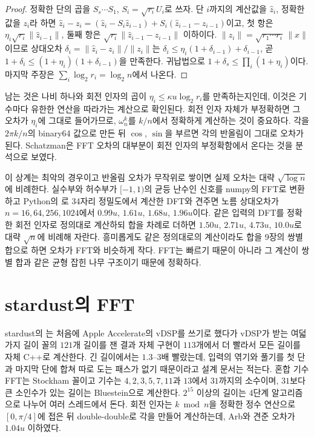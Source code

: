 \begin{proof}
정확한 단의 곱을 $S_s\cdots S_1$, $S_i=\sqrt{r_i}U_i$로 쓰자. 단 $i$까지의 계산값을 $\hat z_i$, 정확한 값을 $z_i$라 하면 $\hat z_i-z_i=(\hat z_i-S_i\hat z_{i-1})+S_i(\hat z_{i-1}-z_{i-1})$이고, 첫 항은 $\eta_i\sqrt{r_i}\|\hat z_{i-1}\|$, 둘째 항은 $\sqrt{r_i}\|\hat z_{i-1}-z_{i-1}\|$ 이하이다. $\|z_i\|=\sqrt{r_1\cdots r_i}\,\|x\|$이므로 상대오차 $\delta_i=\|\hat z_i-z_i\|/\|z_i\|$는 $\delta_i\le\eta_i(1+\delta_{i-1})+\delta_{i-1}$, 곧 $1+\delta_i\le(1+\eta_i)(1+\delta_{i-1})$을 만족한다. 귀납법으로 $1+\delta_s\le\prod_i(1+\eta_i)$이다. 마지막 주장은 $\sum_i\log_2r_i=\log_2n$에서 나온다.
\end{proof}

남는 것은 나비 하나와 회전 인자의 곱이 $\eta_i\le\kappa u\log_2r_i$를 만족하는지인데, 이것은 기수마다 유한한 연산을 따라가는 계산으로 확인된다. 회전 인자 자체가 부정확하면 그 오차가 $\eta_i$에 그대로 들어가므로, $\omega_n^k$를 $k/n$에서 정확하게 계산하는 것이 중요하다. 각을 $2\pi k/n$의 binary64 값으로 만든 뒤 $\cos$, $\sin$을 부르면 각의 반올림이 그대로 오차가 된다. Schatzman은 FFT 오차의 대부분이 회전 인자의 부정확함에서 온다는 것을 분석으로 보였다\cite{schatzman1996}.

이 상계는 최악의 경우이고 반올림 오차가 무작위로 쌓이면 실제 오차는 대략 $\sqrt{\log n}$에 비례한다. 실수부와 허수부가 $[-1,1)$의 균등 난수인 신호를 numpy의 FFT로 변환하고 Python의 로 34자리 정밀도에서 계산한 DFT와 견주면 노름 상대오차가 $n=16,64,256,1024$에서 $0.99u$, $1.61u$, $1.68u$, $1.96u$이다. 같은 입력의 DFT를 정확한 회전 인자로 정의대로 계산하되 합을 차례로 더하면 $1.50u$, $2.71u$, $4.73u$, $10.0u$로 대략 $\sqrt n$에 비례해 자란다. 흥미롭게도 같은 정의대로의 계산이라도 합을 9장의 쌍별 합으로 하면 오차가 FFT와 비슷하게 작다. FFT는 빠르기 때문이 아니라 그 계산이 쌍별 합과 같은 균형 잡힌 나무 구조이기 때문에 정확하다.

\section{stardust의 FFT}
\label{sec:fft-stardust}

\begin{instardust}
stardust의 는 처음에 Apple Accelerate의 vDSP를 쓰기로 했다가 vDSP가 받는 여덟 가지 길이 꼴의 $121$개 길이를 잰 결과 자체 구현이 $113$개에서 더 빨라서 모든 길이를 자체 C++로 계산한다. 긴 길이에서는 $1.3$--$3$배 빨랐는데, 입력의 엮기와 풀기를 첫 단과 마지막 단에 합쳐 따로 도는 패스가 없기 때문이라고 설계 문서는 적는다. 혼합 기수 FFT는 Stockham 꼴이고 기수는 $4,2,3,5,7,11$과 $13$에서 $31$까지의 소수이며, $31$보다 큰 소인수가 있는 길이는 Bluestein으로 계산한다. $2^{15}$ 이상의 길이는 4단계 알고리즘으로 나누어 여러 스레드에서 돈다. 회전 인자는 $k\bmod n$을 정확한 정수 연산으로 $[0,\pi/4]$에 접은 뒤 double-double로 각을 만들어 계산하는데, Arb와 견준 오차가 $1.04u$ 이하였다.
\end{instardust}

